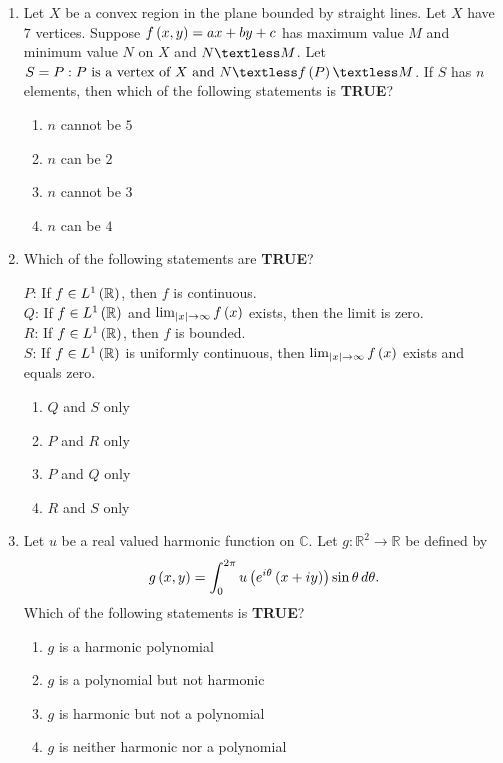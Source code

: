 \documentclass[journal,12pt,twocolumn]{IEEEtran}
\theoremstyle{remark}
\begin{document}
\begin{enumerate}[start=40]
    \item Let $X$ be a convex region in the plane bounded by straight lines. Let $X$ have $7$ vertices. Suppose $f \left(x, y\right) = ax + by + c$ has maximum value $M$ and minimum value $N$ on $X$ and $N \textless M$. Let $S = {P: P \text{ is a vertex of } X \text{ and } N \textless f \brak{P} \textless M}$. If $S$ has $n$ elements, then which of the following statements is \textbf{TRUE}?
    \begin{enumerate}
        \item $n$ cannot be $5$
        \item $n$ can be $2$
        \item $n$ cannot be $3$
        \item $n$ can be $4$
    \end{enumerate}

    \item Which of the following statements are \textbf{TRUE}?
    
    $P$: If $f \in L^1 \left(\mathbb{R}\right)$, then $f$ is continuous. \\
    $Q$: If $f \in L^1 \left(\mathbb{R}\right)$ and $\lim_{\left\vert x\right\vert \to \infty} f \left(x\right)$ exists, then the limit is zero. \\
    $R$: If $f \in L^1 \left(\mathbb{R}\right)$, then $f$ is bounded. \\
    $S$: If $f \in L^{1} \left(\mathbb{R}\right)$ is uniformly continuous, then $\lim_{\left\vert x\right\vert \to \infty} f \left(x\right)$ exists and equals zero.
    
    \begin{enumerate}
        \item $Q$ and $S$ only
        \item $P$ and $R$ only
        \item $P$ and $Q$ only
        \item $R$ and $S$ only
    \end{enumerate}

    \item Let $u$ be a real valued harmonic function on $\mathbb{C}$. Let $g: \mathbb{R}^{2} \rightarrow \mathbb{R}$ be defined by
    \[
    g \left(x, y\right) = \int_{0}^{2 \pi} u \left(e^{i \theta} \left(x + iy\right)\right) \sin \theta \, d \theta.
    \]
    Which of the following statements is \textbf{TRUE}?
    \begin{enumerate}
        \item $g$ is a harmonic polynomial
        \item $g$ is a polynomial but not harmonic
        \item $g$ is harmonic but not a polynomial
        \item $g$ is neither harmonic nor a polynomial
    \end{enumerate}


\end{enumerate}
\end{document}
